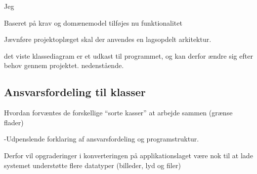 Jeg 

Baseret på krav og domænemodel tilføjes nu funktionalitet

Jævnføre projektoplæget skal der anvendes en lagsopdelt arkitektur. 

det viste klassediagram er et udkast til programmet, og kan derfor ændre sig efter behov gennem projektet. nedenstående.


\subsection{Ansvarsfordeling til klasser}
Hvordan forvæntes de forskellige “sorte kasser” at arbejde sammen (grænse flader)

-Udpenslende forklaring af ansvarsfordeling og programstruktur.  

Derfor vil opgraderinger i konverteringen på applikationslaget være nok til at lade systemet understøtte flere datatyper (billeder, lyd og filer)